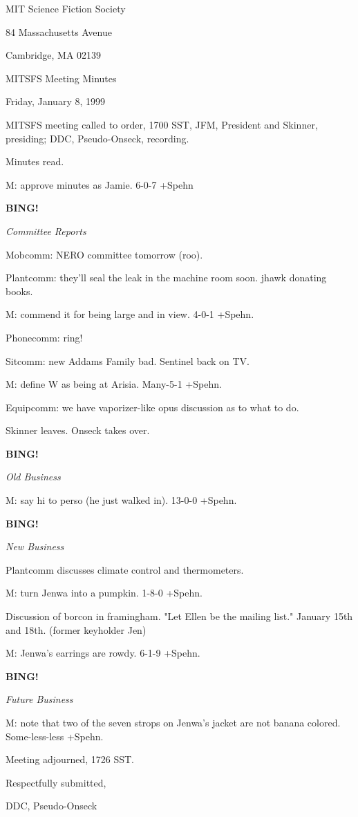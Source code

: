 \documentclass[12pt]{article}
\newcommand{\bing}{{\bf BING!} }
\newcommand{\goto}[1]{\bing \vskip 12pt \centerline{{\em{#1}}}}
\begin{document}
\begin{center}

MIT Science Fiction Society 

84 Massachusetts Avenue

Cambridge, MA 02139

\vspace{12pt}

MITSFS Meeting Minutes 

Friday, January 8, 1999

\end{center}
 
\vspace{18pt}

\setlength{\parskip}{6pt}

\noindent
MITSFS meeting called to order, 1700 SST,
JFM, President and Skinner, presiding; DDC, Pseudo-Onseck, recording.

Minutes read.

M: approve minutes as Jamie. 6-0-7 +Spehn

\goto{Committee Reports}

Mobcomm: NERO committee tomorrow (roo).

Plantcomm: they'll seal the leak in the machine room soon. jhawk donating books.

M: commend it for being large and in view. 4-0-1 +Spehn.

Phonecomm: ring!

Sitcomm: new Addams Family bad. Sentinel back on TV.

M: define W as being at Arisia. Many-5-1 +Spehn.

Equipcomm: we have vaporizer-like opus discussion as to what to do.

Skinner leaves. Onseck takes over.

\goto{Old Business}

M: say hi to perso (he just walked in). 13-0-0 +Spehn.

\goto{New Business}

Plantcomm discusses climate control and thermometers.

M: turn Jenwa into a pumpkin. 1-8-0 +Spehn.

Discussion of borcon in framingham. "Let Ellen be the mailing list." January 15th and 18th. (former keyholder Jen)

M: Jenwa's earrings are rowdy. 6-1-9 +Spehn.

\goto{Future Business}

M: note that two of the seven strops on Jenwa's jacket are not banana colored. Some-less-less +Spehn.

\vspace{12pt}

\noindent
Meeting adjourned, 1726 SST.

\vspace{18pt}

\centerline{Respectfully submitted,}
\centerline{DDC, Pseudo-Onseck}
\end{document}
